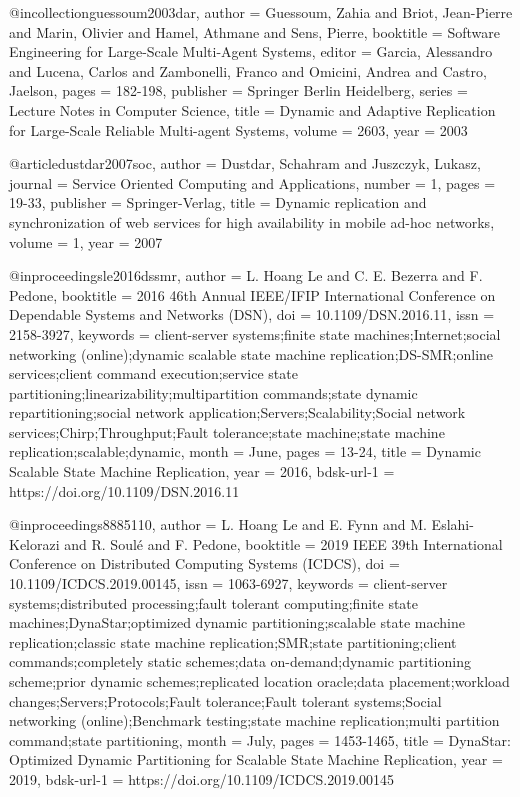 @incollection{guessoum2003dar,
  author    = {Guessoum, Zahia and Briot, Jean-Pierre and Marin, Olivier and Hamel, Athmane and Sens, Pierre},
  booktitle = {Software Engineering for Large-Scale Multi-Agent Systems},
  editor    = {Garcia, Alessandro and Lucena, Carlos and Zambonelli, Franco and Omicini, Andrea and Castro, Jaelson},
  pages     = {182-198},
  publisher = {Springer Berlin Heidelberg},
  series    = {Lecture Notes in Computer Science},
  title     = {Dynamic and Adaptive Replication for Large-Scale Reliable Multi-agent Systems},
  volume    = {2603},
  year      = {2003}
}

@article{dustdar2007soc,
  author    = {Dustdar, Schahram and Juszczyk, Lukasz},
  journal   = {Service Oriented Computing and Applications},
  number    = {1},
  pages     = {19-33},
  publisher = {Springer-Verlag},
  title     = {Dynamic replication and synchronization of web services for high availability in mobile ad-hoc networks},
  volume    = {1},
  year      = {2007}
}

@inproceedings{le2016dssmr,
  author     = {L. {Hoang Le} and C. E. {Bezerra} and F. {Pedone}},
  booktitle  = {2016 46th Annual IEEE/IFIP International Conference on Dependable Systems and Networks (DSN)},
  doi        = {10.1109/DSN.2016.11},
  issn       = {2158-3927},
  keywords   = {client-server systems;finite state machines;Internet;social networking (online);dynamic scalable state machine replication;DS-SMR;online services;client command execution;service state partitioning;linearizability;multipartition commands;state dynamic repartitioning;social network application;Servers;Scalability;Social network services;Chirp;Throughput;Fault tolerance;state machine;state machine replication;scalable;dynamic},
  month      = {June},
  pages      = {13-24},
  title      = {Dynamic Scalable State Machine Replication},
  year       = {2016},
  bdsk-url-1 = {https://doi.org/10.1109/DSN.2016.11}
}

@inproceedings{8885110,
  author     = {L. {Hoang Le} and E. {Fynn} and M. {Eslahi-Kelorazi} and R. {Soul{\'e}} and F. {Pedone}},
  booktitle  = {2019 IEEE 39th International Conference on Distributed Computing Systems (ICDCS)},
  doi        = {10.1109/ICDCS.2019.00145},
  issn       = {1063-6927},
  keywords   = {client-server systems;distributed processing;fault tolerant computing;finite state machines;DynaStar;optimized dynamic partitioning;scalable state machine replication;classic state machine replication;SMR;state partitioning;client commands;completely static schemes;data on-demand;dynamic partitioning scheme;prior dynamic schemes;replicated location oracle;data placement;workload changes;Servers;Protocols;Fault tolerance;Fault tolerant systems;Social networking (online);Benchmark testing;state machine replication;multi partition command;state partitioning},
  month      = {July},
  pages      = {1453-1465},
  title      = {DynaStar: Optimized Dynamic Partitioning for Scalable State Machine Replication},
  year       = {2019},
  bdsk-url-1 = {https://doi.org/10.1109/ICDCS.2019.00145}
}

